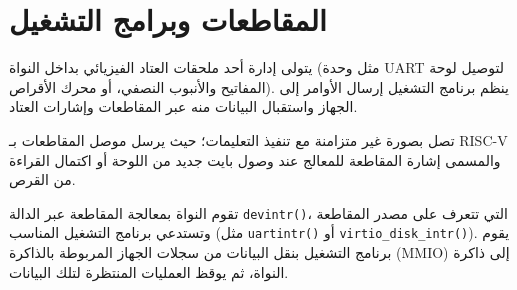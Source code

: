 \chapter{المقاطعات وبرامج التشغيل}
\label{chap:interrupt}

يتولى  إدارة أحد ملحقات العتاد الفيزيائي بداخل النواة (مثل وحدة UART لتوصيل لوحة المفاتيح والأنبوب النصفي، أو محرك الأقراص).
ينظم برنامج التشغيل إرسال الأوامر إلى الجهاز واستقبال البيانات منه عبر المقاطعات وإشارات العتاد.

تصل  بصورة غير متزامنة مع تنفيذ التعليمات؛
حيث يرسل موصل المقاطعات بـ RISC-V والمسمى  إشارة المقاطعة للمعالج عند وصول بايت جديد من اللوحة أو اكتمال القراءة من القرص.

تقوم النواة بمعالجة المقاطعة عبر الدالة \texttt{devintr()}، التي تتعرف على مصدر المقاطعة وتستدعي برنامج التشغيل المناسب (مثل \texttt{uartintr()} أو \texttt{virtio_disk_intr()}).
يقوم برنامج التشغيل بنقل البيانات من سجلات الجهاز المربوطة بالذاكرة (MMIO) إلى ذاكرة النواة، ثم يوقظ العمليات المنتظرة لتلك البيانات.

